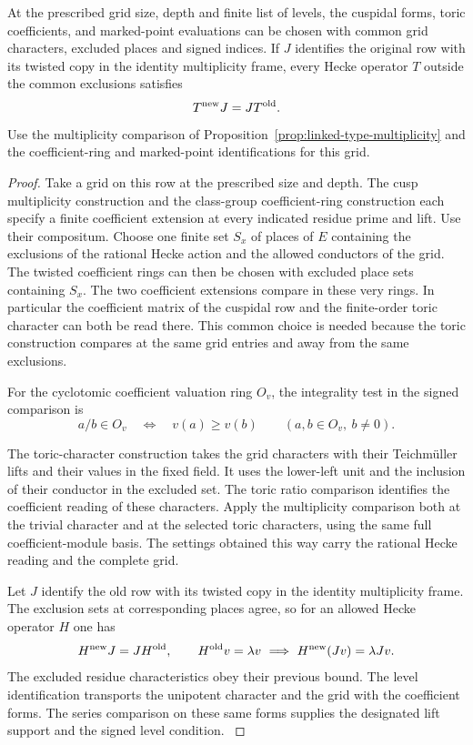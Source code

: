 \begin{proposition}
At the prescribed grid size, depth and finite list of levels, the cuspidal forms, toric coefficients, and marked-point evaluations can be chosen with common grid characters, excluded places and signed indices. If \(J\) identifies the original row with its twisted copy in the identity multiplicity frame, every Hecke operator \(T\) outside the common exclusions satisfies
\[
 T^{\rm new}J=JT^{\rm old}.
\]
Use the multiplicity comparison of Proposition~\ref{prop:linked-type-multiplicity}
and the coefficient-ring and marked-point identifications for this
grid. \label{cor:automorphic-realization-28}
\end{proposition}
\begin{proof}
Take a grid on this row at the prescribed size and depth.
The cusp multiplicity construction and the class-group
coefficient-ring construction each specify a finite
coefficient extension at every indicated residue prime and
lift. Use their compositum. Choose one finite set \(S_x\)
of places of \(E\) containing the exclusions of the rational
Hecke action and the allowed conductors of the grid.
The twisted coefficient rings can then be chosen with
excluded place sets containing \(S_x\). The two coefficient
extensions compare in these very rings. In particular the
coefficient matrix of the cuspidal row and the finite-order
toric character can both be read there. This common choice
is needed because the toric construction compares at the
same grid entries and away from the same exclusions.
\label{cor:automorphic-realization-29}

For the cyclotomic coefficient valuation ring \(O_v\), the
integrality test in the signed comparison is
\[
 a/b\in O_v\quad\Longleftrightarrow\quad v(a)\ge v(b)
       \qquad(a,b\in O_v,\ b\ne0).
\]

The toric-character construction takes the
grid characters with their Teichm\"uller lifts and
their values in the fixed field. It uses the lower-left
unit and the inclusion of their conductor in the excluded
set. The toric ratio comparison identifies the coefficient
reading of these characters. Apply the multiplicity
comparison both at the trivial character and at the
selected toric characters, using the same full
coefficient-module basis. The settings obtained this way
carry the rational Hecke reading and the complete grid.
\label{cor:automorphic-realization-30}

Let \(J\) identify the old row with its twisted copy in the
identity multiplicity frame. The exclusion sets at corresponding
places agree, so for an allowed Hecke operator \(H\) one has
\[
 H^{\rm new}J=JH^{\rm old},\qquad
 H^{\rm old}v=\lambda v\ \Longrightarrow\
             H^{\rm new}(Jv)=\lambda Jv .
\]
The excluded residue characteristics obey their previous bound.
The level identification transports the unipotent character and
the grid with the coefficient forms. The series comparison on
these same forms supplies the designated lift support and the
signed level condition. \label{cor:automorphic-realization-31}


\end{proof}
